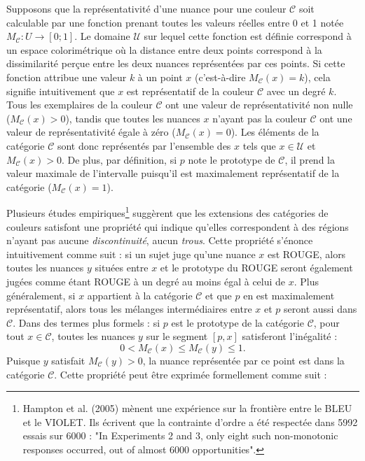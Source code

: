 \documentclass{article}
\begin{document}
Supposons que la représentativité d’une nuance pour une couleur $\mathcal{C}$ soit calculable par une fonction prenant toutes les valeurs réelles entre 0 et 1 notée $M_\mathcal{C}: U \rightarrow [0;1]$. Le domaine $\mathcal{U}$ sur lequel cette fonction est définie correspond à un espace colorimétrique où la distance entre deux points correspond à la dissimilarité perçue entre les deux nuances représentées par ces points. Si cette fonction attribue une valeur $k$ à un point $x$ (c’est-à-dire $M_\mathcal{C}(x)=k$), cela signifie intuitivement que $x$ est représentatif de la couleur $\mathcal{C}$ avec un degré $k$. Tous les exemplaires de la couleur $\mathcal{C}$ ont une valeur de représentativité non nulle ($M_\mathcal{C}(x)>0$), tandis que toutes les nuances $x$ n’ayant pas la couleur $\mathcal{C}$ ont une valeur de représentativité égale à zéro ($M_\mathcal{C}(x)=0$). Les éléments de la catégorie $\mathcal{C}$ sont donc représentés par l’ensemble des $x$ tels que $x\in\mathcal{U}$ et $M_\mathcal{C}(x)>0$. De plus, par définition, si $p$ note le prototype de $\mathcal{C}$, il prend la valeur maximale de l'intervalle puisqu'il est maximalement représentatif de la catégorie ($M_\mathcal{C}(x)=1$).
\par
Plusieurs études empiriques\footnote{Hampton et al. (2005) mènent une expérience sur la frontière entre le BLEU et le VIOLET. Ils écrivent que la contrainte d'ordre a été respectée dans 5992 essais sur 6000 : "In Experiments 2 and 3, only eight such non-monotonic responses occurred, out of almost 6000 opportunities".} suggèrent que les extensions des catégories de couleurs satisfont une propriété qui indique qu’elles correspondent à des régions n’ayant pas aucune \textit{discontinuité}, aucun \textit{trous}. Cette propriété s’énonce intuitivement comme suit : si un sujet juge qu’une nuance $x$ est ROUGE, alors toutes les nuances $y$ situées entre $x$ et le prototype du ROUGE seront également jugées comme étant ROUGE à un degré au moins égal à celui de $x$. Plus généralement, si $x$ appartient à la catégorie $\mathcal{C}$ et que $p$ en est maximalement représentatif, alors tous les mélanges intermédiaires entre $x$ et $p$ seront aussi dans $\mathcal{C}$. Dans des termes plus formels : si \( p \) est le prototype de la catégorie \( \mathcal{C} \), pour tout \( x \in \mathcal{C} \), toutes les nuances \( y \) sur le segment \([p,x]\) satisferont l’inégalité : 
\[
0 < M_{\mathcal{C}}(x) \leq M_{\mathcal{C}}(y) \leq 1.
\] 
Puisque \( y \) satisfait \( M_{\mathcal{C}}(y) > 0 \), la nuance représentée par ce point est dans la catégorie \( \mathcal{C} \). Cette propriété peut être exprimée formellement comme suit :
\end{document}
